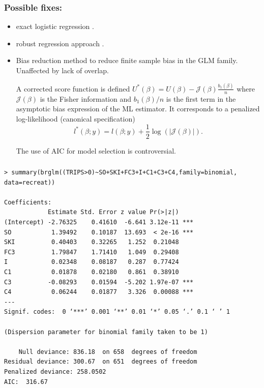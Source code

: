 \documentclass{beamer}
\newcommand{\bs}{\bigskip}
\begin{document}
\begin{frame}
\frametitle{Possible fixes:}
\begin{itemize}
\item exact logistic regression \cite{Meht:Pate:1995}.
\item robust regression approach \cite{Rous:Chri:2002}.
\item Bias reduction method \cite{Firt:1993,Kosm:Firt:2009} to
reduce finite sample bias in the GLM family. Unaffected by lack of overlap.

\bs

A corrected score function is defined $U^*(\beta) = U(\beta) -\mathcal{J}(\beta) \frac{b_1(\beta)}{n}  $
where $\mathcal{J}(\beta)$ is the Fisher information and $b_1(\beta)/n$ is
the first term in the asymptotic bias expression of the ML
estimator. It corresponds to a penalized log-likeli\-hood (canonical
specification)
$$l^*(\beta;y) = l(\beta;y) + \frac{1}{2} \log(|\mathcal{J}(\beta)|).$$

The use of AIC for model selection  is
controversial. 
\end{itemize}
\end{frame}

\begin{frame}[fragile]
\frametitle{}
{\scriptsize
\begin{verbatim}
> summary(brglm((TRIPS>0)~SO+SKI+FC3+I+C1+C3+C4,family=binomial,
data=recreat))

Coefficients:
            Estimate Std. Error z value Pr(>|z|)    
(Intercept) -2.76325    0.41610  -6.641 3.12e-11 ***
SO           1.39492    0.10187  13.693  < 2e-16 ***
SKI          0.40403    0.32265   1.252  0.21048    
FC3          1.79847    1.71410   1.049  0.29408    
I            0.02348    0.08187   0.287  0.77424    
C1           0.01878    0.02180   0.861  0.38910    
C3          -0.08293    0.01594  -5.202 1.97e-07 ***
C4           0.06244    0.01877   3.326  0.00088 ***
---
Signif. codes:  0 ‘***’ 0.001 ‘**’ 0.01 ‘*’ 0.05 ‘.’ 0.1 ‘ ’ 1

(Dispersion parameter for binomial family taken to be 1)

    Null deviance: 836.18  on 658  degrees of freedom
Residual deviance: 300.67  on 651  degrees of freedom
Penalized deviance: 258.0502 
AIC:  316.67
\end{verbatim}
}
\end{frame}
\end{document}
